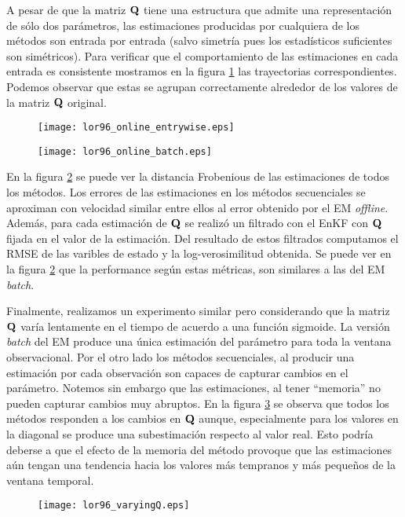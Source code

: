 A pesar de que la matriz $\mathbf{Q}$ tiene una estructura que admite una representación de sólo dos parámetros, las estimaciones producidas por cualquiera de los métodos son entrada por entrada (salvo simetría pues los estadísticos suficientes son simétricos). Para verificar que el comportamiento de las estimaciones en cada entrada es consistente mostramos en la figura \ref{fig:lor96_online_entrywise} las trayectorias correspondientes. Podemos observar que estas se agrupan correctamente alrededor de los valores de la matriz $\mathbf{Q}$ original.
\begin{figure}[t]
    \centering
    \texttt{[image: lor96\_online\_entrywise.eps]}
    \caption{}
    \label{fig:lor96_online_entrywise}
\end{figure}
\begin{figure}[h]
    \centering
    \texttt{[image: lor96\_online\_batch.eps]}
    \caption{}
    \label{fig:lor96_online_batch}
\end{figure}
En la figura \ref{fig:lor96_online_batch} se puede ver la distancia Frobenious de las estimaciones de todos los métodos. Los errores de las estimaciones en los métodos secuenciales se aproximan con velocidad similar entre ellos al error obtenido por el EM \textit{offline}. Además, para cada estimación de $\mathbf{Q}$ se realizó un filtrado con el EnKF con $\mathbf{Q}$ fijada en el valor de la estimación. Del resultado de estos filtrados computamos el RMSE de las varibles de estado y la log-verosimilitud obtenida. Se puede ver en la figura \ref{fig:lor96_online_batch} que la performance según estas métricas, son similares a las del EM \textit{batch}.

Finalmente, realizamos un experimento similar pero considerando que la matriz $\mathbf{Q}$ varía lentamente en el tiempo de acuerdo a una función sigmoide. La versión \textit{batch} del EM produce una única estimación del parámetro para toda la ventana observacional. Por el otro lado los métodos secuenciales, al producir una estimación por cada observación son capaces de capturar cambios en el parámetro. Notemos sin embargo que las estimaciones, al tener ``memoria'' no pueden capturar cambios muy abruptos. En la figura \ref{fig:lor96_varyingQ} se observa que todos los métodos responden a los cambios en $\mathbf{Q}$ aunque, especialmente para los valores en la diagonal se produce una subestimación respecto al valor real. Esto podría deberse a que el efecto de la memoria del método provoque que las estimaciones aún tengan una tendencia hacia los valores más tempranos y más pequeños de la ventana temporal. 
\begin{figure}[h]
    \centering
    \texttt{[image: lor96\_varyingQ.eps]}
    \caption{}
    \label{fig:lor96_varyingQ}
\end{figure}

